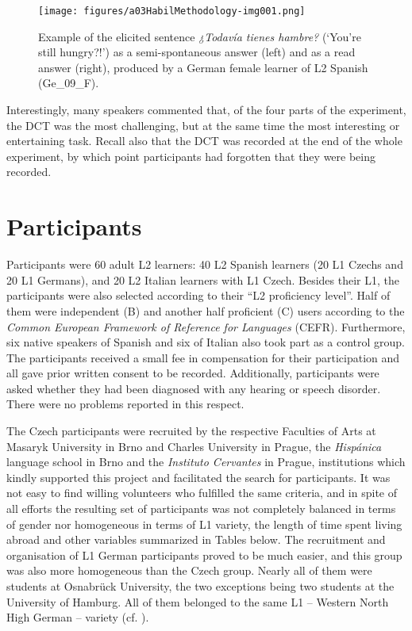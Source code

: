 \begin{figure}
\texttt{[image: figures/a03HabilMethodology-img001.png]}




\caption{Example of the elicited sentence \textit{¿Todavía tienes hambre?} (‘You’re still hungry?!’) as a semi-spontaneous answer (left) and as a read answer (right), produced by a German female learner of L2 Spanish (Ge\_09\_F).}
\label{fig:3.1}
\end{figure}



Interestingly, many speakers commented that, of the four parts of the experiment, the DCT was the most challenging, but at the same time the most interesting or entertaining task. Recall also that the DCT was recorded at the end of the whole experiment, by which point participants had forgotten that they were being recorded.


\section{Participants}\label{sec:3.2}

Participants were 60 adult L2 learners: 40 L2 Spanish learners (20 L1 Czechs and 20 L1 Germans), and 20 L2 Italian learners with L1 Czech. Besides their L1, the participants were also selected according to their “L2 proficiency level”. Half of them were independent (B) and another half proficient (C) users according to the \textit{Common European Framework of Reference for Languages} (CEFR). Furthermore, six native speakers of Spanish and six of Italian also took part as a control group. The participants received a small fee in compensation for their participation and all gave prior written consent to be recorded. Additionally, participants were asked whether they had been diagnosed with any hearing or speech disorder. There were no problems reported in this respect.



The Czech participants were recruited by the respective Faculties of Arts at Masaryk University in Brno and Charles University in Prague, the \textit{Hispánica} language school in Brno and the \textit{Instituto Cervantes} in Prague, institutions which kindly supported this project and facilitated the search for participants. It was not easy to find willing volunteers who fulfilled the same criteria, and in spite of all efforts the resulting set of participants was not completely balanced in terms of gender nor homogeneous in terms of L1 variety, the length of time spent living abroad and other variables summarized in Tables below. The recruitment and organisation of L1 German participants proved to be much easier, and this group was also more homogeneous than the Czech group. Nearly all of them were students at Osnabrück University, the two exceptions being two students at the University of Hamburg. All of them belonged to the same L1 -- Western North High German -- variety (cf. ).



